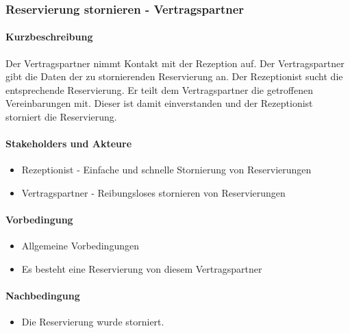 \subsubsection{Reservierung stornieren - Vertragspartner}

\paragraph{Kurzbeschreibung}
Der \Gls{Vertragspartner} nimmt Kontakt mit der \Gls{Rezeption} auf. Der \Gls{Vertragspartner} gibt die Daten der zu stornierenden Reservierung an. Der \Gls{Rezeptionist} sucht die entsprechende \Gls{Reservierung}. Er teilt dem \Gls{Vertragspartner} die getroffenen Vereinbarungen mit. Dieser ist damit einverstanden und der \Gls{Rezeptionist} storniert die \Gls{Reservierung}.

\paragraph{Stakeholders und Akteure}
\begin{itemize}
\item \Gls{Rezeptionist} - Einfache und schnelle Stornierung von Reservierungen
\item \Gls{Vertragspartner} - Reibungsloses stornieren von Reservierungen
\end{itemize}

\paragraph{Vorbedingung}
\begin{itemize}
\item Allgemeine Vorbedingungen
\item Es besteht eine \Gls{Reservierung} von diesem \Gls{Vertragspartner}
\end{itemize}

\paragraph{Nachbedingung}
\begin{itemize}
\item Die \Gls{Reservierung} wurde storniert.
\end{itemize}

